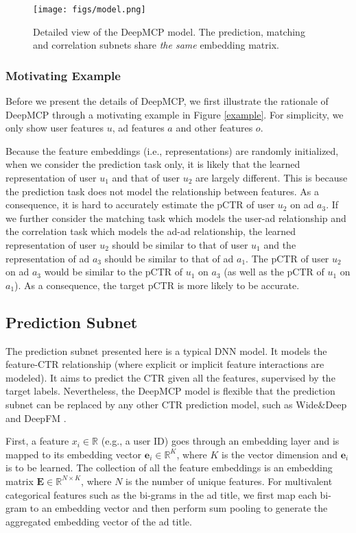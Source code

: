 \documentclass{article}
\begin{document}
\begin{figure*}[!t]
\centering
\texttt{[image: figs/model.png]}
\vskip -4pt
\caption{Detailed view of the DeepMCP model. The prediction, matching and correlation subnets share \emph{the same} embedding matrix.}
\vskip -6pt
\label{model_detail}
\end{figure*}

\subsubsection{Motivating Example}
Before we present the details of DeepMCP, we first illustrate the rationale of DeepMCP through a motivating example in Figure \ref{example}. For simplicity, we only show user features $u$, ad features $a$  and other features $o$.

Because the feature embeddings (i.e., representations) are randomly initialized, when we consider the prediction task only, it is likely that the learned representation of user $u_1$ and that of user $u_2$ are largely different. This is because the prediction task does not model the relationship between features.
As a consequence, it is hard to accurately estimate the pCTR of user $u_2$ on ad $a_3$.
If we further consider the matching task which models the user-ad relationship and the correlation task which models the ad-ad relationship, the learned representation of user $u_2$ should be similar to that of user $u_1$ and the representation of ad $a_3$ should be similar to that of ad $a_1$. The pCTR of user $u_2$ on ad $a_3$ would be similar to the pCTR of $u_1$ on $a_3$ (as well as the pCTR of $u_1$ on $a_1$). As a consequence, the target pCTR is more likely to be accurate.

\subsection{Prediction Subnet}
The prediction subnet presented here is a typical DNN model. It models the feature-CTR relationship (where explicit or implicit feature interactions are modeled). It aims to predict the CTR given all the features, supervised by the target labels.
Nevertheless, the DeepMCP model is flexible that the prediction subnet can be replaced by any other CTR prediction model, such as Wide\&Deep \cite{cheng2016wide} and DeepFM \cite{guo2017deepfm}.

First, a feature $x_i \in \mathbb{R}$ (e.g., a user ID) goes through an embedding layer and is mapped to its embedding vector $\mathbf{e}_i \in \mathbb{R}^K$, where $K$ is the vector dimension and $\mathbf{e}_i$ is to be learned. The collection of all the feature embeddings is an embedding matrix $\mathbf{E} \in \mathbb{R}^{N\times K}$, where $N$ is the number of unique features. For multivalent categorical features such as the bi-grams in the ad title, we first map each bi-gram to an embedding vector and then perform sum pooling to generate the aggregated embedding vector of the ad title.
\end{document}
